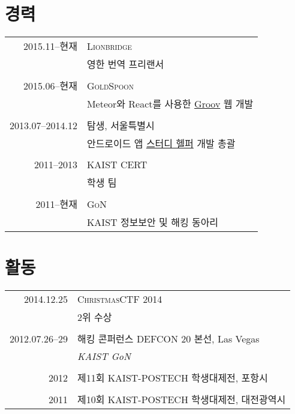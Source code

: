 \documentclass[a4paper,10pt]{article}
\begin{document}
\section{경력}
\begin{tabular}{r|p{11cm}}
  \textsc{2015.11--현재} & \textsc{Lionbridge} \\
  & 영한 번역 프리랜서 \\
  \multicolumn{2}{c}{} \\

  \textsc{2015.06--현재} & \textsc{GoldSpoon} \\
  & Meteor와 React를 사용한 \href{http://groov.fm}{Groov} 웹 개발 \\
  \multicolumn{2}{c}{} \\

  \textsc{2013.07--2014.12} & \textsc{탐생}, 서울특별시 \\
  & 안드로이드 앱 \href{https://play.google.com/store/apps/details?id=kr.co.tamseng.StudyHelper}{스터디 헬퍼} 개발 총괄 \\
  \multicolumn{2}{c}{} \\

  \textsc{2011--2013} & \textsc{KAIST CERT} \\
  & 학생 팀 \\
  \multicolumn{2}{c}{} \\

  \textsc{2011--현재} & \textsc{GoN} \\
  & KAIST 정보보안 및 해킹 동아리 \\
\end{tabular}

\section{활동}
\begin{tabular}{r|p{11cm}}
  \textsc{2014.12.25} & \textsc{ChristmasCTF 2014} \\
  & 2위 수상 \\
  \multicolumn{2}{c}{} \\

  \textsc{2012.07.26--29} & \textsc{해킹 콘퍼런스 DEFCON 20 본선}, Las Vegas \\
  & \emph{KAIST GoN} \\
  \multicolumn{2}{c}{} \\

  \textsc{2012} & \textsc{제11회 KAIST-POSTECH 학생대제전}, 포항시 \\
  \multicolumn{2}{c}{} \\

  \textsc{2011} & \textsc{제10회 KAIST-POSTECH 학생대제전}, 대전광역시 \\
\end{tabular}
\end{document}
